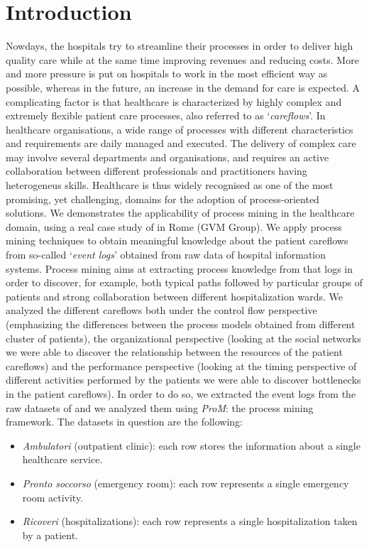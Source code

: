 \section{Introduction}
Nowdays, the hospitals try to streamline their processes in order to deliver high quality care while at the same time improving revenues and reducing costs. More and more pressure is put on hospitals to work in the most efficient way as possible, whereas in the future, an increase in the demand for care is expected. A complicating factor is that healthcare is characterized by highly complex and extremely flexible patient care processes, also referred to as `\textit{careflows}'. In healthcare organisations, a wide range of processes with different characteristics and requirements are daily managed and executed. The delivery of complex care may involve several departments and organisations, and requires an active collaboration between different professionals and practitioners having heterogeneus skills. Healthcare is thus widely recognised as one of the most promising, yet challenging, domains for the adoption of process-oriented solutions. We demonstrates the applicability of process mining in the healthcare domain, using a real case study of \hospital in Rome (GVM Group). We apply process mining techniques to obtain meaningful knowledge about the patient careflows from so-called `\textit{event logs}' obtained from raw data of hospital information systems. Process mining aims at extracting process knowledge from that logs in order to discover, for example, both typical paths followed by particular groups of patients and strong collaboration between different hospitalization wards. We analyzed the different careflows both under the control flow perspective (emphasizing the differences between the process models obtained from different cluster of patients), the organizational perspective (looking at the social networks we were able to discover the relationship between the resources of the patient careflows) and the performance perspective (looking at the timing perspective of different activities performed by the patients we were able to discover bottlenecks in the patient careflows). In order to do so, we extracted the event logs from the raw datasets of \hospital and we analyzed them using \textit{ProM}: the process mining framework. The datasets in question are the following:
\begin{itemize}
\item \textit{Ambulatori} (outpatient clinic): each row stores the information about a single healthcare service.
\item \textit{Pronto soccorso} (emergency room): each row represents a single emergency room activity.
\item \textit{Ricoveri} (hospitalizations): each row represents a single hospitalization taken by a patient.
\end{itemize}
